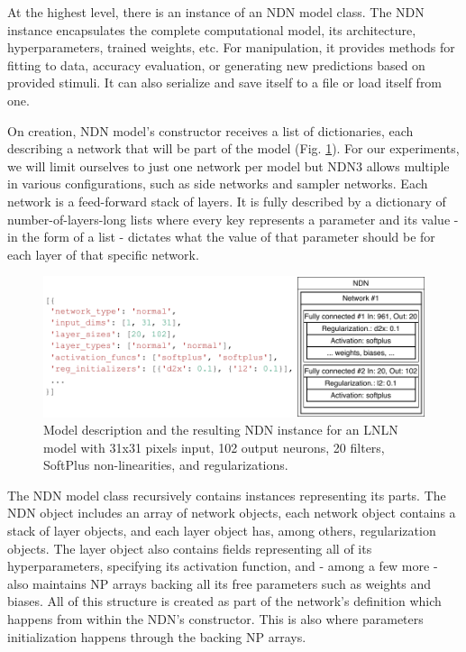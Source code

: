 At the highest level, there is an instance of an NDN model class. The NDN instance encapsulates the complete computational model, its architecture, hyperparameters, trained weights, etc. For manipulation, it provides methods for fitting to data, accuracy evaluation, or generating new predictions based on provided stimuli. It can also serialize and save itself to a file or load itself from one. 

On creation, NDN model’s constructor receives a list of dictionaries, each describing a network that will be part of the model (Fig. \ref{fig:3.1}). For our experiments, we will limit ourselves to just one network per model but NDN3 allows multiple in various configurations, such as side networks and sampler networks. Each network is a feed-forward stack of layers. It is fully described by a dictionary of number-of-layers-long lists where every key represents a parameter and its value - in the form of a list - dictates what the value of that parameter should be for each layer of that specific network.

\begin{figure}[h]
    \centering
    \includegraphics[width=1\textwidth]{../figures/03_NDN_1}
    \caption[NDN model description and subsequent architecture]{Model description and the resulting NDN instance for an LNLN model with 31x31 pixels input, 102 output neurons, 20 filters, SoftPlus non-linearities, and regularizations.}
    \label{fig:3.1}
\end{figure}

The NDN model class recursively contains instances representing its parts. The NDN object includes an array of network objects, each network object contains a stack of layer objects, and each layer object has, among others, regularization objects. The layer object also contains fields representing all of its hyperparameters, specifying its activation function, and - among a few more - also maintains NP arrays backing all its free parameters such as weights and biases. All of this structure is created as part of the network's definition which happens from within the NDN’s constructor. This is also where parameters initialization happens through the backing NP arrays.

